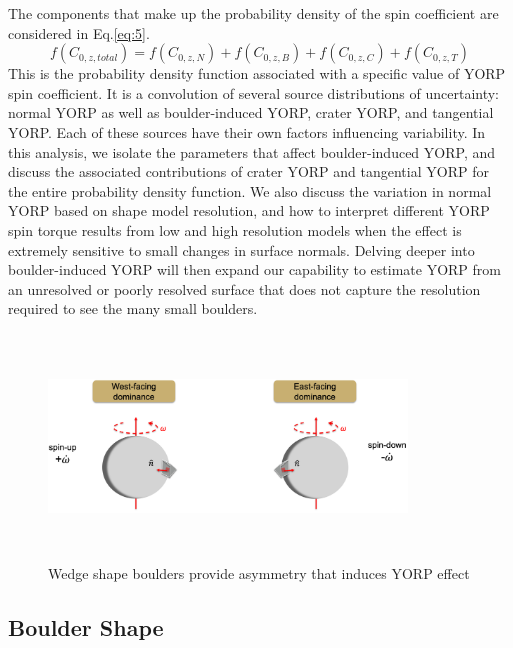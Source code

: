 The components that make up the probability density of the spin coefficient are considered in Eq.\ref{eq:5}.
\begin{equation}\label{eq:5}
    f(C_{0,z, total}) = f(C_{0,z, N})+f(C_{0,z, B})+f(C_{0,z, C})+f(C_{0,z, T})
\end{equation}
This is the probability density function associated with a specific value of YORP spin coefficient. It is a convolution of several source distributions of uncertainty: normal YORP as well as boulder-induced YORP, crater YORP, and tangential YORP. Each of these sources have their own factors influencing variability. In this analysis, we isolate the parameters that affect boulder-induced YORP, and discuss the associated contributions of crater YORP and tangential YORP for the entire probability density function. We also discuss the variation in normal YORP based on shape model resolution, and how to interpret different YORP spin torque results from low and high resolution models when the effect is extremely sensitive to small changes in surface normals. Delving deeper into boulder-induced YORP will then expand our capability to estimate YORP from an unresolved or poorly resolved surface that does not capture the resolution required to see the many small boulders. 

\begin{figure}[t]
    \centering
    \includegraphics[width=0.85\textwidth,height=6cm]{fig/wedge_orientations.png}
    \caption{Wedge shape boulders provide asymmetry that induces YORP effect}
    \label{fig:wedges_on_asteroid}
\end{figure}
\subsection{Boulder Shape}

